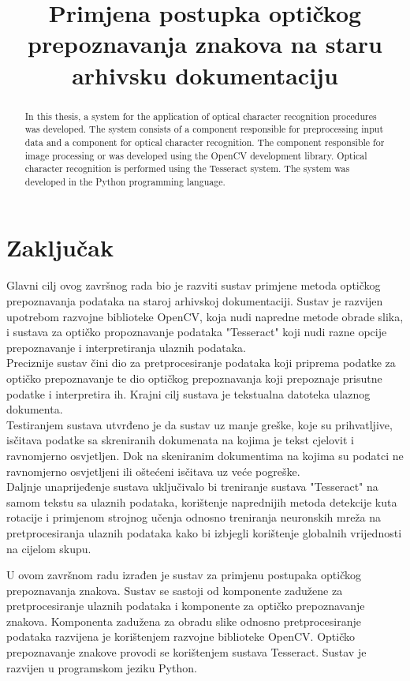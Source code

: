 \documentclass[times, utf8, zavrsni, numeric]{fer}
\begin{document}
\chapter{Zaključak}
Glavni cilj ovog završnog rada bio je razviti sustav primjene metoda optičkog prepoznavanja podataka na staroj arhivskoj dokumentaciji. Sustav je razvijen upotrebom razvojne biblioteke OpenCV, koja nudi napredne metode obrade slika, i sustava za optičko propoznavanje podataka "Tesseract" koji nudi razne opcije prepoznavanje i interpretiranja ulaznih podataka. 
\\
Preciznije sustav čini dio za pretprocesiranje podataka koji priprema podatke za optičko prepoznavanje te dio optičkog prepoznavanja koji prepoznaje prisutne podatke i interpretira ih. Krajni cilj sustava je tekstualna datoteka ulaznog dokumenta. 
\\
Testiranjem sustava utvrđeno je da sustav uz manje greške, koje su prihvatljive, isčitava podatke sa skreniranih dokumenata na kojima je tekst cjelovit i ravnomjerno osvjetljen. Dok na skeniranim dokumentima na kojima su podatci ne ravnomjerno osvjetljeni ili oštećeni isčitava uz veće pogreške.
\\
Daljnje unaprijeđenje sustava uključivalo bi treniranje sustava "Tesseract" na samom tekstu sa ulaznih podataka, korištenje naprednijih metoda detekcije kuta rotacije i primjenom strojnog učenja odnosno treniranja neuronskih mreža na pretprocesiranja ulaznih podataka kako bi izbjegli korištenje globalnih vrijednosti na cijelom skupu.




\title{Primjena postupka optičkog prepoznavanja znakova na staru arhivsku dokumentaciju}
\begin{sazetak}
U ovom završnom radu izrađen je sustav za primjenu postupaka optičkog prepoznavanja znakova. Sustav se sastoji od komponente zadužene za pretprocesiranje ulaznih podataka i komponente za optičko prepoznavanje znakova. Komponenta zadužena za obradu slike odnosno pretprocesiranje podataka razvijena je korištenjem razvojne biblioteke OpenCV. Optičko prepoznavanje znakove provodi se korištenjem sustava Tesseract. Sustav je razvijen u programskom jeziku Python.

\end{sazetak}

\begin{abstract}
In this thesis, a system for the application of optical character recognition procedures was developed. The system consists of a component responsible for preprocessing input data and a component for optical character recognition. The component responsible for image processing or was developed using the OpenCV development library. Optical character recognition is performed using the Tesseract system. The system was developed in the Python programming language.

\end{abstract}
\end{document}
